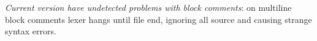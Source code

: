 \secdown
{}\label{linecomment}



\label{blockcomment}

\emph{Current version have undetected problems with block comments}:
on multiline block comments lexer hangs until file end,
ignoring all source and causing strange syntax errors.



\secup
